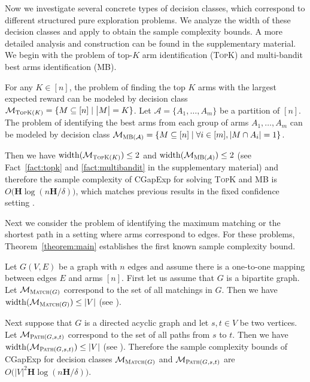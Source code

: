 \documentclass{article}
\newcommand{\Algorithm}{{\small \textsf{CGapExp}}\xspace}
\newcommand{\M}{\mathcal M}
\DeclareMathOperator{\rank}{width}
\newcommand{\MultiIdent}{\textsc{TopK}\xspace}
\newcommand{\MultiBandit}{\textsc{MB}\xspace}
\newcommand{\Match}{\textsc{Match}\xspace}
\newcommand{\Path}{\textsc{Path}\xspace}
\begin{document}
Now we investigate several concrete types of decision classes, which correspond to different structured pure exploration problems. 
We analyze the width of these decision classes and apply  to obtain the sample complexity bounds.
A more detailed analysis and construction can be found in the supplementary material.
We begin with the problem of top-$K$ arm identification (\MultiIdent) and multi-bandit best arms identification (\MultiBandit).
\begin{example}[\MultiIdent and \MultiBandit]
\label{example:topk}
For any $K\in[n]$, the problem of finding the top $K$ arms with the largest expected reward can be modeled by decision class $\M_{\MultiIdent(K)}=\{M\subseteq [n] \mid \big|M\big| = K\}$.
Let $\mathcal A=\{A_1,\ldots,A_m\}$ be a partition of $[n]$. 
The problem of identifying the best arms from each group of arms $A_1,\ldots,A_m$ can be modeled by decision class
$\M_{\MultiBandit(\mathcal A)} = \{M \subseteq [n] \mid \forall i\in [m], |M\cap A_i| = 1\}$.

Then we have $\rank(\M_{\MultiIdent(K)}) \le 2$ and $\rank(\M_{\MultiBandit(\mathcal A)}) \le 2$
(see Fact~\ref{fact:topk} and \ref{fact:multibandit} in the supplementary material) and therefore the sample complexity of \Algorithm for solving \MultiIdent and \MultiBandit is $O\big(\mathbf H \log(n\mathbf H/\delta)\big)$, which matches previous results in the fixed confidence setting \citep{kalyanakrishnan2012pac,gabillon2012best}.
\end{example}

Next we consider the problem of identifying the maximum matching or the shortest path in a setting where arms correspond to edges.
For these problems, Theorem~\ref{theorem:main} establishes the first known sample complexity bound.
\begin{example}
Let $G(V,E)$ be a graph with $n$ edges and assume there is a one-to-one mapping between edges $E$ and arms $[n]$.
First let us assume that $G$ is a bipartite graph. 
Let $\M_{\Match(G)}$ correspond to the set of all matchings in $G$.
Then we have $\rank(\M_{\Match(G)}) \le |V|$ (see ).

Next suppose that $G$ is a directed acyclic graph and let $s,t\in V$ be two vertices.
Let $\M_{\Path(G,s,t)}$ correspond to the set of all paths from $s$ to $t$.
Then we have $\rank(\M_{\Path(G,s,t)}) \le |V|$ (see ).
Therefore the sample complexity bounds of \Algorithm for decision classes $\M_{\Match(G)}$ and $\M_{\Path(G,s,t)}$ are $O\big(|V|^2 \mathbf H \log (n\mathbf H/\delta)\big)$.
\end{example}
\end{document}
